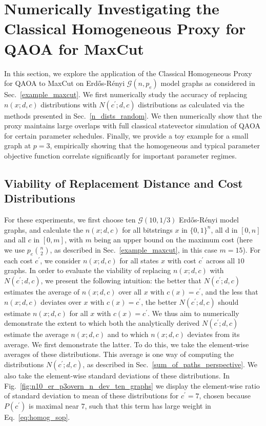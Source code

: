 \documentclass[superscriptaddress,pra,aps,10pt,longbibliography,notitlepage]{revtex4-1}
\newcommand*\cp{c^\prime}
\begin{document}
\section{Numerically Investigating the Classical Homogeneous Proxy for QAOA for MaxCut}\label{validity_of_approximation}

In this section, we explore the application of the Classical Homogeneous Proxy for QAOA to MaxCut on Erd\H{o}s-R\'{e}nyi $\mathcal{G}(n, p_e)$ model graphs as considered in Sec.~\ref{example_maxcut}. We first numerically study the accuracy of replacing $n(x;d,c)$ distributions with $N(\cp;d,c)$ distributions as calculated via the methods presented in Sec.~\ref{n_dists_random}. We then numerically show that the proxy maintains large overlaps with full classical statevector simulation of QAOA for certain parameter schedules. Finally, we provide a toy example for a small graph at $p=3$, empirically showing that the homogeneous and typical parameter objective function correlate significantly for important parameter regimes.


\subsection{Viability of Replacement Distance and Cost Distributions}

For these experiments, we first choose ten $\mathcal{G}(10,1/3)$ Erd\H{o}s-R\'{e}nyi model graphs, and calculate the $n(x;d,c)$ for all bitstrings $x$ in $\{0,1\}^n$, all d in $[0,n]$ and all $c$ in $[0,m]$, with $m$ being an upper bound on the maximum cost (here we use $p_e \binom{n}{2}$, as described in Sec.~\ref{example_maxcut}, in this case $m=15$). For each cost $\cp$, we consider $n(x;d,c)$ for all states $x$ with cost $\cp$ across all $10$ graphs. In order to evaluate the viability of replacing $n(x;d,c)$ with $N(\cp;d,c)$, we present the following intuition: the better that $N(\cp;d,c)$ estimates the average of $n(x;d,c)$ over all $x$ with $c(x)=\cp$, and the less that $n(x;d,c)$ deviates over $x$ with $c(x)=\cp$, the better $N(\cp;d,c)$ should estimate $n(x;d,c)$ for all $x$ with $c(x)=\cp$. We thus aim to numerically demonstrate the extent to which both the analytically derived $N(\cp;d,c)$ estimate the average $n(x;d,c)$ and to which $n(x;d,c)$ deviates from its average. We first demonstrate the latter. To do this, we take the element-wise averages of these distributions. This average is one way of computing the distributions $N(\cp;d,c)$, as described in Sec.~\ref{sum_of_paths_perspective}. We also take the element-wise standard deviations of these distributions. In Fig.~\ref{fig:n10_er_p3overn_n_dev_ten_graphs} we display the element-wise ratio of standard deviation to mean of these distributions for $\cp=7$, chosen because $P(\cp)$ is maximal near $7$, such that this term has large weight in Eq.~\eqref{eq:homog_sop}.
\end{document}
